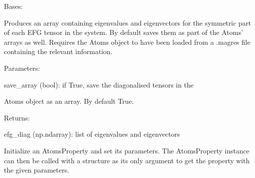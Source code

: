 \documentclass[letterpaper,10pt,english]{sphinxmanual}
\begin{document}
\begin{fulllineitems}
\label{doctree/soprano.properties.nmr.efg:soprano.properties.nmr.efg.EFGDiagonal}
Bases: {\hyperref[doctree/soprano.properties.atomsproperty:soprano.properties.atomsproperty.AtomsProperty]{\emph{}}}

Produces an array containing eigenvalues and eigenvectors for the
symmetric part of each EFG tensor in the system. By default
saves them as part of the Atoms' arrays as well.
Requires the Atoms object to have been loaded from a .magres file
containing the relevant information.

\begin{DUlineblock}{0em}
\item[] Parameters:
\item[]
\begin{DUlineblock}{\DUlineblockindent}
\item[] save\_array (bool): if True, save the diagonalised tensors in the
\item[]
\begin{DUlineblock}{\DUlineblockindent}
\item[] Atoms object as an array. By default True.
\end{DUlineblock}
\end{DUlineblock}
\end{DUlineblock}

\begin{DUlineblock}{0em}
\item[] Returns:
\item[]
\begin{DUlineblock}{\DUlineblockindent}
\item[] efg\_diag (np.ndarray): list of eigenvalues and eigenvectors
\end{DUlineblock}
\end{DUlineblock}

Initialize an AtomsProperty and set its parameters.
The AtomsProperty instance can then be called with a structure as its
only argument to get the property with the given parameters.


\end{fulllineitems}
\end{document}
